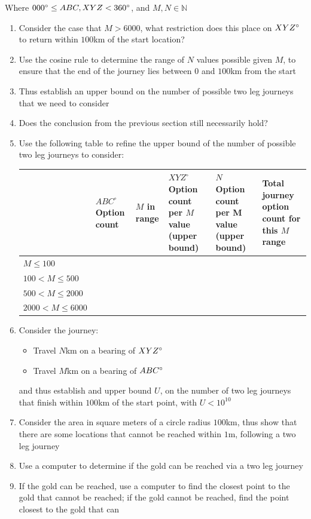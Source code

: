 \documentclass{article}
\begin{document}
Where $000\degree \leq ABC, XYZ < 360\degree$, and $M,N \in \mathbb{N}$

\begin{enumerate}
    \item Consider the case that $M>6000$, what restriction does this place on $XYZ\degree$ to return within $100$km of the start location?
    \item Use the cosine rule to determine the range of $N$ values possible given $M$, to ensure that the end of the journey lies between $0$ and $100$km from the start
    \item Thus establish an upper bound on the number of possible two leg journeys that we need to consider
    \item Does the conclusion from the previous section still necessarily hold?
    \item Use the following table to refine the upper bound of the number of possible two leg journeys to consider:

\begin{table}[h]
\centering
\begin{tabularx}{\textwidth}{|l|X|X|X|X|X|}
\hline
 & $ABC^{\circ}$ Option count &  $M$ in range &  $XYZ^{\circ}$ Option count per $M$ value (upper bound) & $N$ Option count per M value (upper bound) & Total journey option count for this $M$ range \\
\hline
$M \le 100$            & & & & & \\
\hline
$100 < M \le 500$      & & & & & \\
\hline
$500 < M \le 2000$     & & & & & \\
\hline
$2000 < M \le 6000$    & & & & & \\
\hline
\end{tabularx}
\end{table}

\item Consider the journey:
\begin{itemize}
    \item Travel $N$km on a bearing of $XYZ\degree$
    \item Travel $M$km on a bearing of $ABC\degree$
\end{itemize}
and thus establish and upper bound $U$, on the number of two leg journeys that finish within $100$km of the start point, with $U < 10^{10}$

\item Consider the area in square meters of a circle radius $100$km, thus show that there are some locations that cannot be reached within $1$m, following a two leg journey
\item Use a computer to determine if the gold can be reached via a two leg journey
\item If the gold can be reached, use a computer to find the closest point to the gold that cannot be reached; if the gold cannot be reached, find the point closest to the gold that can

\end{enumerate}
\end{document}
